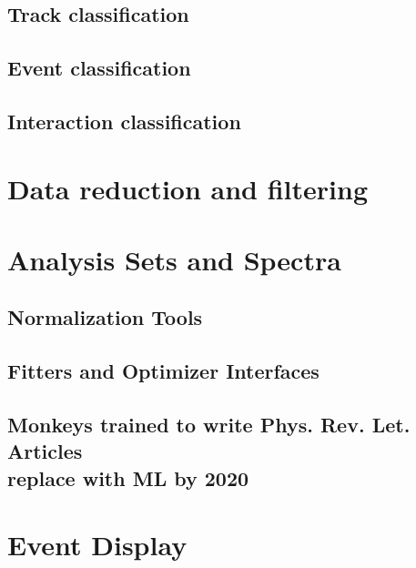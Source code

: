 \subsection{Track classification}
\subsection{Event classification}
\subsection{Interaction classification}

\section{Data reduction and filtering}

\section{Analysis Sets and Spectra}
\subsection{Normalization Tools}
\subsection{Fitters and Optimizer Interfaces}
\subsection{Monkeys trained to write Phys. Rev. Let. Articles\\ replace with ML by 2020}

\section{Event Display}  %
